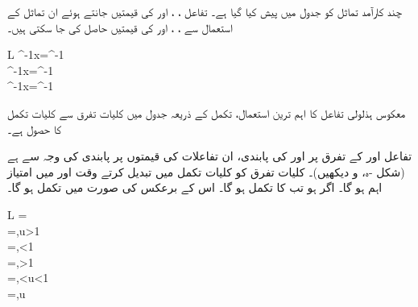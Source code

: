 چند کارآمد تماثل کو جدول  میں پیش کیا گیا ہے۔ تفاعل ، ،  اور  کی قیمتیں جانتے ہوئے ان تماثل کے استعمال سے  ، ،  اور  کی قیمتیں حاصل کی جا سکتی ہیں۔

\begin{table}
\caption{معکوس ہذلولی تفاعل کے چند کارآمد تماثل}
\label{جدول_ماورائی_چند_کارآمد_تماثل}
\centering
\renewcommand{\arraystretch}{2}
\begin{tabular}{L}
\toprule
\sech^{-1}x=\cosh^{-1}\\
\csch^{-1}x=\sinh^{-1}\\
\coth^{-1}x=\tanh^{-1}\\
\bottomrule
\end{tabular}
\end{table}

معکوس ہذلولی تفاعل کا اہم ترین استعمال،  تکمل کے ذریعہ  جدول  میں کلیات تفرق سے کلیات تکمل کا حصول ہے۔

تفاعل  اور  کے تفرق پر  اور  کی پابندی، ان تفاعلات کی قیمتوں پر پابندی کی وجہ سے ہے (شکل -ہ، و دیکھیں)۔ کلیات تفرق کو کلیات تکمل میں تبدیل کرتے وقت  اور  میں امتیاز اہم ہو گا۔ اگر  ہو تب  کا تکمل  ہو گا۔ اس کے برعکس  کی صورت میں تکمل  ہو گا۔

\begin{table}
\caption{معکوس ہذلولی تفاعل کے تفرق۔}
\label{جدول_ماورائی_الٹ_ہذلولی_تفرق}
\centering
\renewcommand{\arraystretch}{2}
\begin{tabular}{L}
\toprule
{}=\\
=,\quad u>1\\
=,\quad {}<1\\
=,\quad {}>1\\
=,<u<1\\
=,\quad u\\
\bottomrule
\end{tabular}
\end{table}

